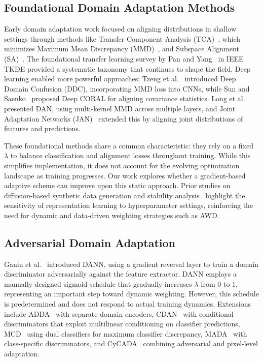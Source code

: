 \documentclass[pdflatex,sn-mathphys-num]{sn-jnl}
\theoremstyle{thmstyleone}
\theoremstyle{thmstyletwo}
\theoremstyle{thmstylethree}
\begin{document}
\subsection{Foundational Domain Adaptation Methods}

Early domain adaptation work focused on aligning distributions in shallow settings through methods like Transfer Component Analysis (TCA)~\cite{pan2011tca}, which minimizes Maximum Mean Discrepancy (MMD)~\cite{gretton2012kernel}, and Subspace Alignment (SA)~\cite{fernando2013sa}. The foundational transfer learning survey by Pan and Yang~\cite{pan2010survey} in IEEE TKDE provided a systematic taxonomy that continues to shape the field. Deep learning enabled more powerful approaches: Tzeng et al.~\cite{tzeng2014ddc} introduced Deep Domain Confusion (DDC), incorporating MMD loss into CNNs, while Sun and Saenko~\cite{sun2016coral} proposed Deep CORAL for aligning covariance statistics. Long et al.~\cite{long2015dan} presented DAN, using multi-kernel MMD across multiple layers, and Joint Adaptation Networks (JAN)~\cite{long2017jan} extended this by aligning joint distributions of features and predictions.

These foundational methods share a common characteristic: they rely on a fixed $\lambda$ to balance classification and alignment losses throughout training. While this simplifies implementation, it does not account for the evolving optimization landscape as training progresses. Our work explores whether a gradient-based adaptive scheme can improve upon this static approach. Prior studies on diffusion-based synthetic data generation and stability analysis~\cite{khazrak2025addressing, khazrak2025feasibility} highlight the sensitivity of representation learning to hyperparameter settings, reinforcing the need for dynamic and data-driven weighting strategies such as AWD.

\subsection{Adversarial Domain Adaptation}

Ganin et al.~\cite{ganin2016dann} introduced DANN, using a gradient reversal layer to train a domain discriminator adversarially against the feature extractor. DANN employs a manually designed sigmoid schedule that gradually increases $\lambda$ from 0 to 1, representing an important step toward dynamic weighting. However, this schedule is predetermined and does not respond to actual training dynamics. Extensions include ADDA~\cite{tzeng2017adda} with separate domain encoders, CDAN~\cite{long2018cdan} with conditional discriminators that exploit multilinear conditioning on classifier predictions, MCD~\cite{saito2018mcd} using dual classifiers for maximum classifier discrepancy, MADA~\cite{pei2018mada} with class-specific discriminators, and CyCADA~\cite{hoffman2018cycada} combining adversarial and pixel-level adaptation.
\end{document}
